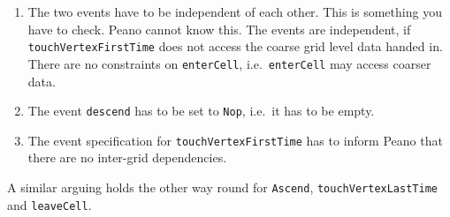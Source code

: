 \begin{enumerate}
  \item The two events have to be independent of each other. This is something
  you have to check. Peano cannot know this. The events are independent, if 
  \texttt{touchVertexFirstTime} does not access the coarse grid level data
  handed in. There are no constraints on \texttt{enterCell}, \linebreak
  i.e.~\texttt{enterCell} may access coarser data.
  \item The event \texttt{descend} has to be set to \texttt{Nop}, i.e.~it has to
  be empty.
  \item The event specification for \texttt{touchVertexFirstTime} has to inform
  Peano that there are no inter-grid dependencies.
\end{enumerate}

\noindent
A similar arguing holds the other way round for \texttt{Ascend},
\texttt{touchVertexLastTime} and \texttt{leaveCell}.
